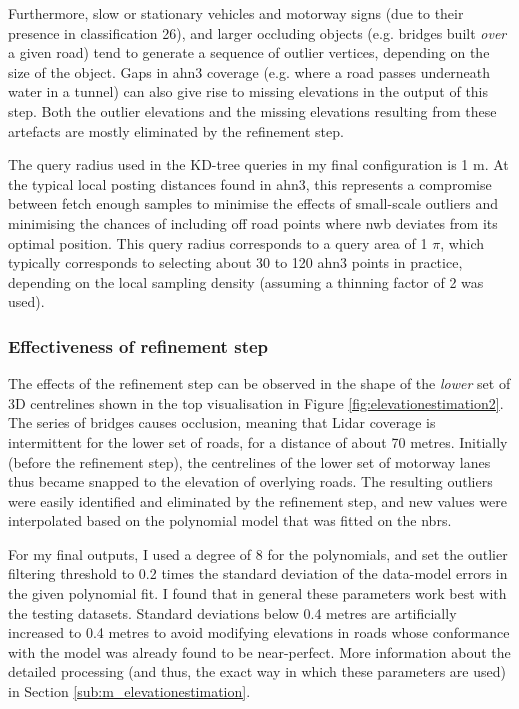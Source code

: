 Furthermore, slow or stationary vehicles and motorway signs (due to their presence in classification 26), and larger occluding objects (e.g. bridges built \textit{over} a given road) tend to generate a sequence of outlier vertices, depending on the size of the object. Gaps in \ac{ahn3} coverage (e.g. where a road passes underneath water in a tunnel) can also give rise to missing elevations in the output of this step. Both the outlier elevations and the missing elevations resulting from these artefacts are mostly eliminated by the refinement step.

The query radius used in the KD-tree queries in my final configuration is 1 m. At the typical local posting distances found in \ac{ahn3}, this represents a compromise between fetch enough samples to minimise the effects of small-scale outliers and minimising the chances of including off road points where \ac{nwb} deviates from its optimal position. This query radius corresponds to a query area of 1 $\pi$, which typically corresponds to selecting about 30 to 120 \ac{ahn3} points in practice, depending on the local sampling density (assuming a thinning factor of 2 was used).

\subsubsection{Effectiveness of refinement step}

The effects of the refinement step can be observed in the shape of the \textit{lower} set of 3D centrelines shown in the top visualisation in Figure \ref{fig:elevationestimation2}. The series of bridges causes occlusion, meaning that Lidar coverage is intermittent for the lower set of roads, for a distance of about 70 metres. Initially (before the refinement step), the centrelines of the lower set of motorway lanes thus became snapped to the elevation of overlying roads. The resulting outliers were easily identified and eliminated by the refinement step, and new values were interpolated based on the polynomial model that was fitted on the \ac{nbrs}.

For my final outputs, I used a degree of 8 for the polynomials, and set the outlier filtering threshold to 0.2 times the standard deviation of the data-model errors in the given polynomial fit. I found that in general these parameters work best with the testing datasets. Standard deviations below 0.4 metres are artificially increased to 0.4 metres to avoid modifying elevations in roads whose conformance with the model was already found to be near-perfect. More information about the detailed processing (and thus, the exact way in which these parameters are used) in Section \ref{sub:m_elevationestimation}.

